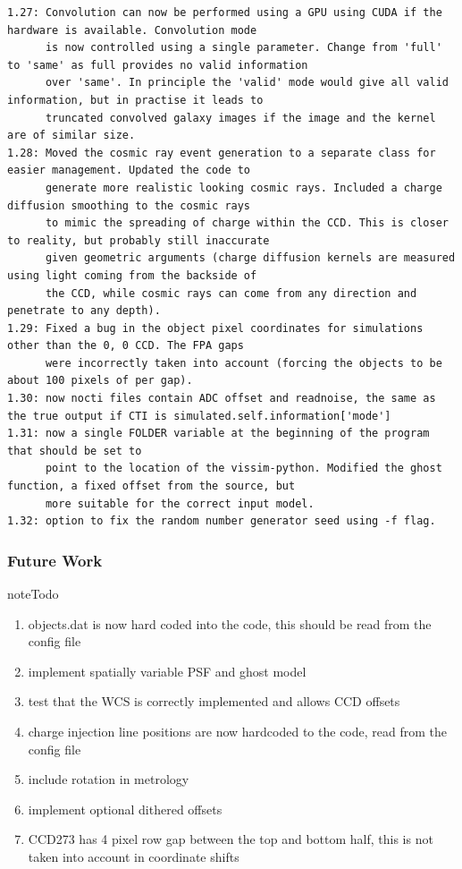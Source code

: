 \documentclass[a4paper,11pt,english]{sphinxmanual}
\begin{document}
\begin{Verbatim}[commandchars=\\\{\}]
1.27: Convolution can now be performed using a GPU using CUDA if the hardware is available. Convolution mode
      is now controlled using a single parameter. Change from 'full' to 'same' as full provides no valid information
      over 'same'. In principle the 'valid' mode would give all valid information, but in practise it leads to
      truncated convolved galaxy images if the image and the kernel are of similar size.
1.28: Moved the cosmic ray event generation to a separate class for easier management. Updated the code to
      generate more realistic looking cosmic rays. Included a charge diffusion smoothing to the cosmic rays
      to mimic the spreading of charge within the CCD. This is closer to reality, but probably still inaccurate
      given geometric arguments (charge diffusion kernels are measured using light coming from the backside of
      the CCD, while cosmic rays can come from any direction and penetrate to any depth).
1.29: Fixed a bug in the object pixel coordinates for simulations other than the 0, 0 CCD. The FPA gaps
      were incorrectly taken into account (forcing the objects to be about 100 pixels of per gap).
1.30: now nocti files contain ADC offset and readnoise, the same as the true output if CTI is simulated.self.information['mode']
1.31: now a single FOLDER variable at the beginning of the program that should be set to
      point to the location of the vissim-python. Modified the ghost function, a fixed offset from the source, but
      more suitable for the correct input model.
1.32: option to fix the random number generator seed using -f flag.
\end{Verbatim}


\subsubsection{Future Work}
\label{simulator:future-work}
\begin{notice}{note}{Todo}
\begin{enumerate}
\item {} 
objects.dat is now hard coded into the code, this should be read from the config file

\item {} 
implement spatially variable PSF and ghost model

\item {} 
test that the WCS is correctly implemented and allows CCD offsets

\item {} 
charge injection line positions are now hardcoded to the code, read from the config file

\item {} 
include rotation in metrology

\item {} 
implement optional dithered offsets

\item {} 
CCD273 has 4 pixel row gap between the top and bottom half, this is not taken into account in coordinate shifts

\end{enumerate}
\end{notice}
\end{document}
